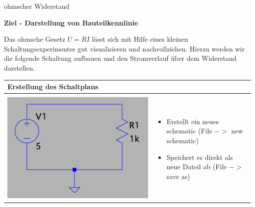 \begin{frame}[t]{ohmscher Widerstand}

  \textbf{Ziel - Darstellung von Bauteilkennlinie}

  \begin{spacing}{0.6} \begin{tiny}

      Das ohmsche Gesetz $U=R I$ lässt sich mit Hilfe eines kleinen Schaltungsexperimentes gut visualisieren und nachvollziehen.
      Hierzu werden wir die folgende Schaltung aufbauen und den Stromverlauf über dem Widerstand darstellen.
    \end{tiny} \end{spacing}
  \begin{spacing}{0.9} \begin{tiny}
      \begin{table}[h!]
        \begin{tabular}{p{3cm} p{7cm}}
          \hline
          \textbf{Erstellung des Schaltplans}   & \\
          \hline                                  \\
          \begin{minipage}{.3\textwidth}
            \includegraphics[width=\linewidth]{pictures/res.png}
          \end{minipage}
                                                &
          \begin{minipage}{.7\textwidth}
            \begin{itemize}
              \item Erstellt ein neues schematic (File $->$ new schematic)
              \item Speichert es direkt als neue Dateil ab (File $->$ save as)

\end{itemize}
\end{minipage}
\end{tabular}
\end{table}
\end{tiny}
\end{spacing}
\end{frame}
